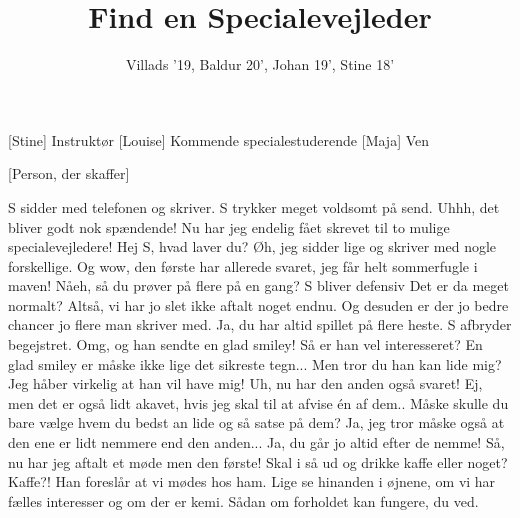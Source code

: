 \documentclass[a4paper,11pt]{article}
\title{Find en Specialevejleder}
\author{Villads '19, Baldur 20', Johan 19', Stine 18'}
\begin{document}
\maketitle

\begin{roles}
[Stine] Instruktør
[Louise] Kommende specialestuderende
[Maja] Ven
\end{roles}

\begin{props}
[Person, der skaffer]
\end{props}

\begin{sketch}
\scene S sidder med telefonen og skriver. S trykker meget voldsomt på send.
 Uhhh, det bliver godt nok spændende! Nu har jeg endelig fået skrevet til to mulige specialevejledere!
 Hej S, hvad laver du?
 Øh, jeg sidder lige og skriver med nogle forskellige. Og wow, den første har allerede svaret, jeg får helt sommerfugle i maven!
 Nåeh, så du prøver på flere på en gang?
\scene S bliver defensiv
 Det er da meget normalt?
Altså, vi har jo slet ikke aftalt noget endnu. Og desuden er der jo bedre chancer jo flere man skriver med.
 Ja, du har altid spillet på flere heste.
\scene S afbryder begejstret.
 Omg, og han sendte en glad smiley! Så er han vel interesseret?
 En glad smiley er måske ikke lige det sikreste tegn...
 Men tror du han kan lide mig? Jeg håber virkelig at han vil have mig! 
 Uh, nu har den anden også svaret! Ej, men det er også lidt akavet, hvis jeg skal til at afvise én af dem..
 Måske skulle du bare vælge hvem du bedst an lide og så satse på dem?
 Ja, jeg tror måske også at den ene er lidt nemmere end den anden...
 Ja, du går jo altid efter de nemme!
  Så, nu har jeg aftalt et møde men den første!
 Skal i så ud og drikke kaffe eller noget?
 Kaffe?! Han foreslår at vi mødes hos ham. Lige se hinanden i øjnene, om vi har fælles interesser og om der er kemi. Sådan om forholdet kan fungere, du ved.

\end{sketch}
\end{document}

